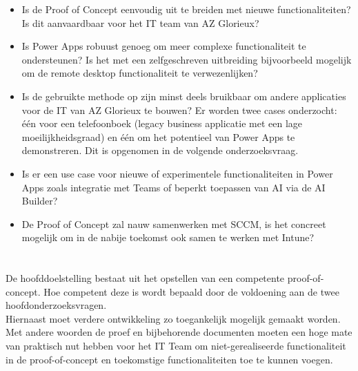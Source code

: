 \begin{itemize}[label={$\circ$}]
    \item Is de Proof of Concept eenvoudig uit te breiden met nieuwe functionaliteiten? Is dit aanvaardbaar voor het IT team van AZ Glorieux?
    \item Is Power Apps robuust genoeg om meer complexe functionaliteit te ondersteunen? Is het met een zelfgeschreven uitbreiding bijvoorbeeld mogelijk om de remote desktop functionaliteit te verwezenlijken?
    \item Is de gebruikte methode op zijn minst deels bruikbaar om andere applicaties voor de IT van AZ Glorieux te bouwen? Er worden twee cases onderzocht: één voor een telefoonboek (legacy business applicatie met een lage moeilijkheidsgraad) en één om het potentieel van Power Apps te demonstreren. Dit is opgenomen in de volgende onderzoeksvraag.
    \item Is er een use case voor nieuwe of experimentele functionaliteiten in Power Apps zoals integratie met Teams of beperkt toepassen van AI via de AI Builder?
    \item De Proof of Concept zal nauw samenwerken met SCCM, is het concreet mogelijk om in de nabije toekomst ook samen te werken met Intune?
\end{itemize}

\section{}
\label{sec:onderzoeksdoelstelling}

De hoofddoelstelling bestaat uit het opstellen van een competente proof-of-concept. Hoe competent deze is wordt bepaald door de voldoening aan de twee hoofdonderzoeksvragen.\\
Hiernaast moet verdere ontwikkeling zo toegankelijk mogelijk gemaakt worden. Met andere woorden de proef en bijbehorende documenten moeten een hoge mate van praktisch nut hebben voor het IT Team om niet-gerealiseerde functionaliteit in de proof-of-concept en toekomstige functionaliteiten toe te kunnen voegen.


\section{}
\label{sec:opzet-bachelorproef}


